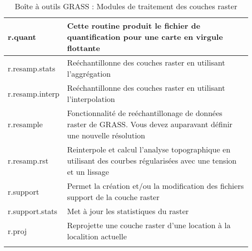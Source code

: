 \begin{center}
{\begin{longtable}{|p{2.5cm}|p{11.5cm}|}
  \hline r.quant & Cette routine produit le fichier de quantification pour une carte en virgule flottante \\
  \hline r.resamp.stats & Reéchantillonne des couches raster en utilisant l'aggrégation \\
  \hline r.resamp.interp & Reéchantillonne des couches raster en utilisant l'interpolation \\
  \hline r.resample & Fonctionnalité de reéchantillonage de données raster de GRASS. Vous devez auparavant définir une nouvelle résolution \\
  \hline r.resamp.rst & Reinterpole et calcul l'analyse topographique en utilisant des courbes régularisées avec une tension et un lissage \\
  \hline r.support & Permet la création et/ou la modification des fichiers support de la couche raster\\
  \hline r.support.stats & Met à jour les statistiques du raster \\
  \hline r.proj & Reprojette une couche raster d'une location à la localition actuelle \\
\hline
\caption{Boîte à outils GRASS : Modules de traitement des couches raster}
\end{longtable}}
\end{center}


